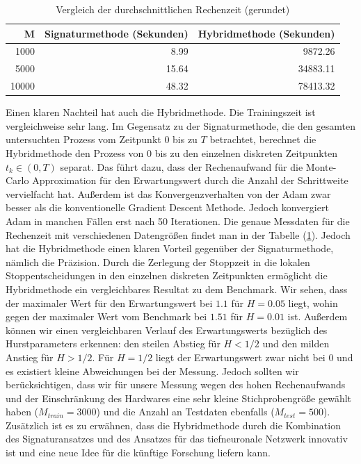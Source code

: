 \documentclass[12pt,titlepage,headsepline]{article}
\begin{document}
        \begin{table}[H]
          \caption{Vergleich der durchschnittlichen Rechenzeit (gerundet)}
          \centering
          \begin{tabular}{rrr}
            \midrule
            M & Signaturmethode (Sekunden) & Hybridmethode (Sekunden) \\
            \toprule
            1000 & 8.99 & 9872.26 \\
            5000 & 15.64 & 34883.11 \\
            10000 & 48.32 & 78413.32 \\
            \midrule
          \end{tabular}
          \label{tbl:vergleich_rechenzeit}
        \end{table}

        \hfill\break
        Einen klaren Nachteil hat auch die Hybridmethode. Die Trainingszeit ist vergleichweise sehr lang. Im Gegensatz zu der Signaturmethode, die den gesamten untersuchten Prozess vom Zeitpunkt $0$ bis zu $T$ betrachtet, berechnet die Hybridmethode den Prozess von $0$ bis zu den einzelnen diskreten Zeitpunkten $t_k \in (0,T)$ separat.
        \hfill\break
        Das führt dazu, dass der Rechenaufwand für die Monte-Carlo Approximation für den Erwartungswert durch die Anzahl der Schrittweite vervielfacht hat. Außerdem ist das Konvergenzverhalten von der Adam zwar besser als die konventionelle Gradient Descent Methode. Jedoch konvergiert Adam in manchen Fällen erst nach 50 Iterationen. Die genaue Messdaten für die Rechenzeit mit verschiedenen Datengrößen findet man in der Tabelle (\ref{tbl:vergleich_rechenzeit}).
        \hfill\break
        Jedoch hat die Hybridmethode einen klaren Vorteil gegenüber der Signaturmethode, nämlich die Präzision. Durch die Zerlegung der Stoppzeit in die lokalen Stoppentscheidungen in den einzelnen diskreten Zeitpunkten ermöglicht die Hybridmethode ein vergleichbares Resultat zu dem Benchmark. Wir sehen, dass der maximaler Wert für den Erwartungswert bei $1.1$ für $H=0.05$ liegt, wohin gegen der maximaler Wert vom Benchmark bei $1.51$ für $H=0.01$ ist. Außerdem können wir einen vergleichbaren Verlauf des Erwartungswerts bezüglich des Hurstparameters erkennen: den steilen Abstieg für $H<1/2$ und den milden Anstieg für $H>1/2$. Für $H=1/2$ liegt der Erwartungswert zwar nicht bei 0 und es existiert kleine Abweichungen bei der Messung. Jedoch sollten wir berücksichtigen, dass wir für unsere Messung wegen des hohen Rechenaufwands und der Einschränkung des Hardwares eine sehr kleine Stichprobengröße gewählt haben ($M_{train}=3000$) und die Anzahl an Testdaten ebenfalls ($M_{test} = 500$). Zusätzlich ist es zu erwähnen, dass die Hybridmethode durch die Kombination des Signaturansatzes und des Ansatzes für das tiefneuronale Netzwerk innovativ ist und eine neue Idee für die künftige Forschung liefern kann.
\end{document}
